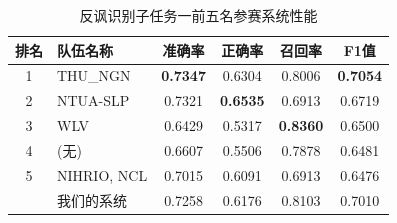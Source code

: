 \begin{table}[htb]
  \centering
  \begin{minipage}[t]{0.9\linewidth}
  \caption{反讽识别子任务一前五名参赛系统性能}
  \label{tab:exp_irony_det_A_other_comp}
    \begin{tabularx}{\linewidth}{c|X|cccc}
    \toprule[1.5pt]
    排名 & 队伍名称 & 准确率 & 正确率 & 召回率 & F1值 \\
    \hline 
    1 & THU\_NGN & \bf 0.7347 & 0.6304 & 0.8006 & \bf 0.7054 \\
    2 & NTUA-SLP & 0.7321 & \bf 0.6535 & 0.6913 & 0.6719 \\
    3 & WLV & 0.6429 & 0.5317 & \bf 0.8360 & 0.6500 \\
    4 & (无) & 0.6607 & 0.5506 & 0.7878 & 0.6481 \\
    5 & NIHRIO, NCL & 0.7015 & 0.6091 & 0.6913 & 0.6476 \\
    \hline 
    & 我们的系统 & 0.7258 & 0.6176 & 0.8103  & 0.7010 \\
    \bottomrule[1.5pt]
    \end{tabularx}
  \end{minipage}
\end{table}


